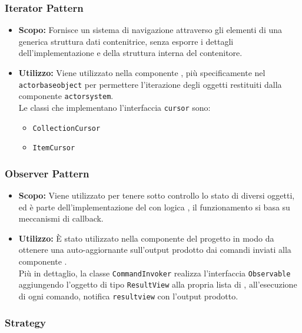 \documentclass{scalatekids-article}
\begin{document}
\subsubsection{Iterator Pattern}

\begin{itemize}
\item \textbf{Scopo:} Fornisce un sistema di navigazione attraverso gli elementi di una generica struttura dati contenitrice,
  senza esporre i dettagli dell'implementazione e della struttura interna del contenitore.
\item \textbf{Utilizzo:} Viene utilizzato nella componente , più specificamente nel  \verb=actorbaseobject=
  per permettere l'iterazione degli oggetti restituiti dalla componente \verb=actorsystem=.\\
  Le classi che implementano l'interfaccia \verb=cursor= sono:
  \begin{itemize}
  \item \verb=CollectionCursor=
  \item \verb=ItemCursor=
  \end{itemize}
\end{itemize}

\subsubsection{Observer Pattern}

\label{sec:ObserverPattern}

\begin{itemize}
\item \textbf{Scopo:} Viene utilizzato per tenere sotto controllo lo stato di diversi oggetti, ed è parte dell'implementazione
  del   con logica , il funzionamento si basa su meccanismi di callback.
\item \textbf{Utilizzo:} È stato utilizzato nella componente  del progetto in modo da ottenere una 
  auto-aggiornante sull'output prodotto dai comandi inviati alla componente .\\
  Più in dettaglio, la classe \verb=CommandInvoker= realizza l'interfaccia \verb=Observable= aggiungendo l'oggetto di tipo
  \verb=ResultView= alla propria lista di , all'esecuzione di ogni comando, notifica \verb=resultview=
  con l'output prodotto.
\end{itemize}

\subsubsection{Strategy}
\end{document}
